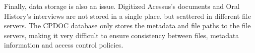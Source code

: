 
Finally, data storage is also an issue. Digitized Acessus's documents and Oral History's interviews are
not stored in a single place, but scattered in different file
servers. The CPDOC database only stores the metadata and file paths to the
file servers, making it very difficult to ensure consistency between
files, metadata information and access control policies.



